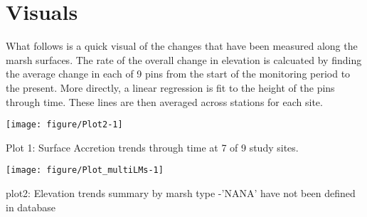 \documentclass{article}\usepackage[]{graphicx}\usepackage[]{color}
\makeatletter
\def\maxwidth{ %
  \ifdim\Gin@nat@width>\linewidth
    \linewidth
  \else
    \Gin@nat@width
  \fi
}
\newenvironment{kframe}{%
 \def\at@end@of@kframe{}%
 \ifinner\ifhmode%
  \def\at@end@of@kframe{\end{minipage}}%
  \begin{minipage}{\columnwidth}%
 \fi\fi%
 \def\FrameCommand##1{\hskip\@totalleftmargin \hskip-\fboxsep
 \colorbox{shadecolor}{##1}\hskip-\fboxsep
     \hskip-\linewidth \hskip-\@totalleftmargin \hskip\columnwidth}%
 \MakeFramed {\advance\hsize-\width
   \@totalleftmargin\z@ \linewidth\hsize
   \@setminipage}}%
 {\par\unskip\endMakeFramed%
 \at@end@of@kframe}
\makeatother
\begin{document}
\section{Visuals}
What follows is a quick visual of the changes that have been measured along the marsh surfaces. The rate of the overall change in elevation is calcuated by finding the average change in each of 9 pins from the start of the monitoring period to the present. More directly, a linear regression is fit to the height of the pins through time. These lines are then averaged across stations for each site. 



{\centering \texttt{[image: figure/Plot2-1]} 

}



Plot 1: Surface Accretion trends through time at 7 of 9 study sites.
\begin{kframe}


{\ttfamily\noindent\bfseries{}}\end{kframe}
\texttt{[image: figure/Plot\_multiLMs-1]} 

plot2: Elevation trends summary by marsh type -'NANA' have not been defined in database
\end{document}
